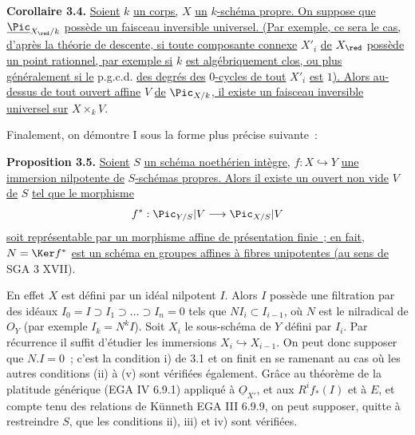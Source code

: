 
\textbf{Corollaire 3.4.} \uline{Soient} \(k\) \uline{un corps,} \(X\) \uline{un} \(k\)\uline{-schéma propre. On suppose que} \(\underline{\Pic}_{X_{\red}/k}\) \uline{possède un faisceau inversible universel. (Par exemple, ce sera le cas, d'après la théorie de descente, si toute composante connexe} \(X'_i\) \uline{de} \(X_{\red}\) \uline{possède un point rationnel, par exemple si} \(k\) \uline{est algébriquement clos, ou plus généralement si le} p.g.c.d. \uline{des degrés des} \(0\)\uline{-cycles de tout} \(X'_i\) \uline{est} \(1\)\uline{). Alors au-dessus de tout ouvert affine} \(V\) \uline{de} \(\Pic_{X/k}\)\uline{, il existe un faisceau inversible universel sur} \(X\times_kV\).

Finalement, on démontre I sous la forme plus précise suivante~:

\textbf{Proposition 3.5.} \uline{Soient} \(S\) \uline{un schéma noethérien intègre,} \(f:X\hookrightarrow Y\) \uline{une immersion nilpotente de} \(S\)\uline{-schémas propres. Alors il existe un ouvert non vide} \(V\) \uline{de} \(S\) \uline{tel que le morphisme}
\[
  f^*:\Pic_{Y/S}|V\longrightarrow\Pic_{X/S}|V
\]
\uline{soit représentable par un morphisme affine de présentation finie~; en fait,} \(N=\Ker f^*\) \uline{est un schéma en groupes affines à fibres unipotentes (au sens de} SGA 3 XVII).

En effet \(X\) est défini par un idéal nilpotent \(I\). Alors \(I\) possède une filtration par des idéaux \(I_0=I\supset I_1\supset\ldots\supset I_n=0\) tels que \(NI_i\subset I_{i-1}\), où \(N\) est le nilradical de \({O}_Y\) (par exemple \(I_k=N^kI\)). Soit \(X_i\) le sous-schéma de \(Y\) défini par \(I_i\). Par récurrence il suffit d'étudier les immersions \(X_i\hookrightarrow X_{i-1}\). On peut donc supposer que \(N.I=0\)~; c'est la condition i) de 3.1 et on finit en se ramenant au cas où les autres conditions (ii) à (v) sont vérifiées également. Grâce au théorème de la platitude générique (EGA IV 6.9.1) appliqué à \(\underline{O}_{X'}\), et aux \(R^if_*(I)\) et à \(E\), et compte tenu des relations de Künneth EGA III 6.9.9, on peut supposer, quitte à restreindre \(S\), que les conditions ii), iii) et iv) sont vérifiées.

